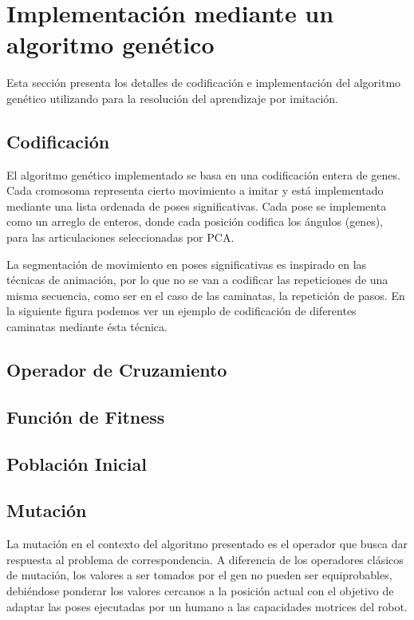 \documentclass[
  twoside,
  11pt, a4paper,
  footinclude=true,
  headinclude=true,
  cleardoublepage=empty
]{scrbook}
\begin{document}
\section{Implementación mediante un algoritmo genético}

Esta sección presenta los detalles de codificación e implementación del algoritmo genético utilizando para la resolución del aprendizaje por imitación. 

\subsection{Codificación}

El algoritmo genético implementado se basa en una codificación entera de genes. Cada cromosoma representa cierto movimiento a imitar y está implementado mediante una lista ordenada de poses significativas. Cada pose se implementa como un arreglo de enteros, donde cada posición codifica los ángulos (genes), para las articulaciones seleccionadas por PCA.

La segmentación de movimiento en poses significativas es inspirado en las técnicas de animación, por lo que no se van a codificar las repeticiones de una misma secuencia, como ser en el caso de las caminatas, la repetición de pasos. En la siguiente figura podemos ver un ejemplo de codificación de diferentes caminatas mediante ésta técnica.

\subsection{Operador de Cruzamiento}

\subsection{Función de Fitness}

\subsection{Población Inicial}

\subsection{Mutación}

La mutación en el contexto del algoritmo presentado es el operador que busca dar respuesta al problema de correspondencia. A diferencia de los operadores clásicos de mutación, los valores a ser tomados por el gen no pueden ser equiprobables, debiéndose ponderar los valores cercanos a la posición actual con el objetivo de adaptar las poses ejecutadas por un humano a las capacidades motrices del robot. 
\end{document}
